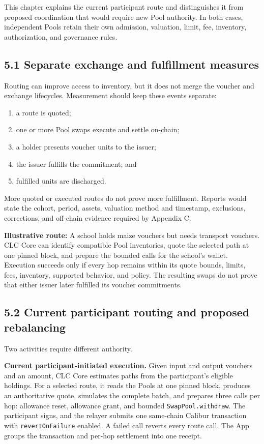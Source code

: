 \documentclass[11pt]{article}
\begin{document}
This chapter explains the current participant route and distinguishes it from proposed coordination that would require new Pool authority. In both cases, independent Pools retain their own admission, valuation, limit, fee, inventory, authorization, and governance rules.

\subsection*{5.1 Separate exchange and fulfillment measures}

Routing can improve access to inventory, but it does not merge the voucher and exchange lifecycles. Measurement should keep these events separate:

\begin{enumerate}[leftmargin=*]
\item a route is quoted;
\item one or more Pool swaps execute and settle on-chain;
\item a holder presents voucher units to the issuer;
\item the issuer fulfills the commitment; and
\item fulfilled units are discharged.
\end{enumerate}
More quoted or executed routes do not prove more fulfillment. Reports would state the cohort, period, assets, valuation method and timestamp, exclusions, corrections, and off-chain evidence required by Appendix C.

\textbf{Illustrative route:} A school holds maize vouchers but needs transport vouchers. CLC Core can identify compatible Pool inventories, quote the selected path at one pinned block, and prepare the bounded calls for the school's wallet. Execution succeeds only if every hop remains within its quote bounds, limits, fees, inventory, supported behavior, and policy. The resulting swaps do not prove that either issuer later fulfilled its voucher commitments.

\subsection*{5.2 Current participant routing and proposed rebalancing}

Two activities require different authority.

\textbf{Current participant-initiated execution.} Given input and output vouchers and an amount, CLC Core estimates paths from the participant's eligible holdings. For a selected route, it reads the Pools at one pinned block, produces an authoritative quote, simulates the complete batch, and prepares three calls per hop: allowance reset, allowance grant, and bounded \texttt{SwapPool.withdraw}. The participant signs, and the relayer submits one same-chain Calibur transaction with \texttt{revertOnFailure} enabled. A failed call reverts every route call. The App groups the transaction and per-hop settlement into one receipt.
\end{document}
